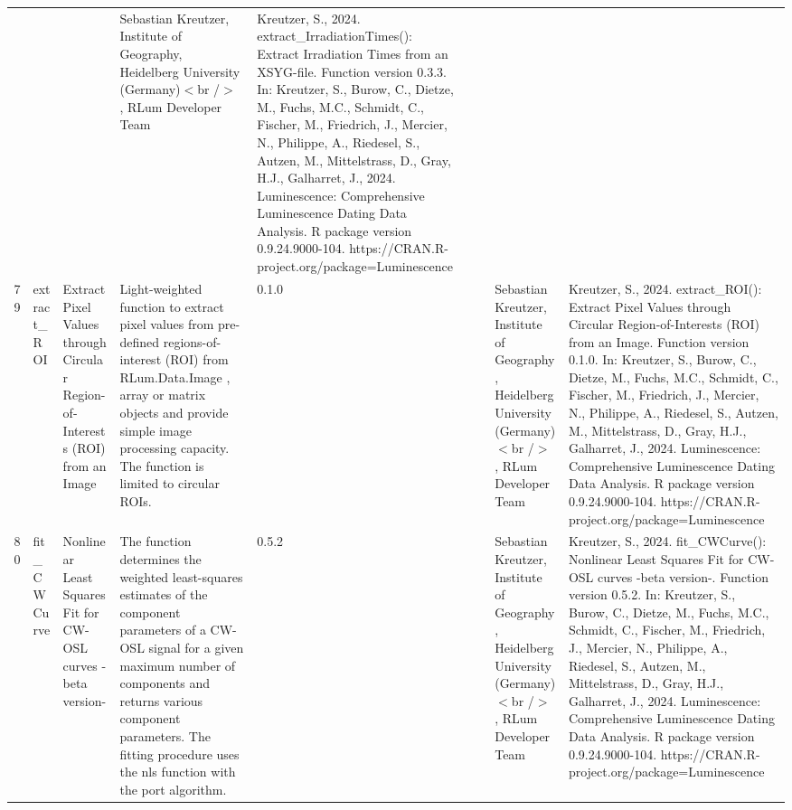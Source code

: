 \begin{table}[ht]
\begin{tabular}{rllllllll}
 &  &  & Sebastian Kreutzer, Institute of Geography, Heidelberg University (Germany)$<$br /$>$ , RLum Developer Team & Kreutzer, S., 2024. extract\_IrradiationTimes(): Extract Irradiation Times from an XSYG-file. Function version 0.3.3. In: Kreutzer, S., Burow, C., Dietze, M., Fuchs, M.C., Schmidt, C., Fischer, M., Friedrich, J., Mercier, N., Philippe, A., Riedesel, S., Autzen, M., Mittelstrass, D., Gray, H.J., Galharret, J., 2024. Luminescence: Comprehensive Luminescence Dating Data Analysis. R package version 0.9.24.9000-104. https://CRAN.R-project.org/package=Luminescence
 \\ 
  79 & extract\_ROI & Extract Pixel Values through Circular Region-of-Interests (ROI) from an Image & Light-weighted function to extract pixel values from pre-defined regions-of-interest (ROI) from RLum.Data.Image ,  array  or  matrix  objects and provide simple image processing capacity. The function is limited to circular ROIs. & 0.1.0
 &  &  & Sebastian Kreutzer, Institute of Geography, Heidelberg University (Germany)$<$br /$>$ , RLum Developer Team & Kreutzer, S., 2024. extract\_ROI(): Extract Pixel Values through Circular Region-of-Interests (ROI) from an Image. Function version 0.1.0. In: Kreutzer, S., Burow, C., Dietze, M., Fuchs, M.C., Schmidt, C., Fischer, M., Friedrich, J., Mercier, N., Philippe, A., Riedesel, S., Autzen, M., Mittelstrass, D., Gray, H.J., Galharret, J., 2024. Luminescence: Comprehensive Luminescence Dating Data Analysis. R package version 0.9.24.9000-104. https://CRAN.R-project.org/package=Luminescence
 \\ 
  80 & fit\_CWCurve & Nonlinear Least Squares Fit for CW-OSL curves -beta version- & The function determines the weighted least-squares estimates of the component parameters of a CW-OSL signal for a given maximum number of components and returns various component parameters. The fitting procedure uses the  nls  function with the  port  algorithm. & 0.5.2
 &  &  & Sebastian Kreutzer, Institute of Geography, Heidelberg University (Germany)$<$br /$>$ , RLum Developer Team & Kreutzer, S., 2024. fit\_CWCurve(): Nonlinear Least Squares Fit for CW-OSL curves -beta version-. Function version 0.5.2. In: Kreutzer, S., Burow, C., Dietze, M., Fuchs, M.C., Schmidt, C., Fischer, M., Friedrich, J., Mercier, N., Philippe, A., Riedesel, S., Autzen, M., Mittelstrass, D., Gray, H.J., Galharret, J., 2024. Luminescence: Comprehensive Luminescence Dating Data Analysis. R package version 0.9.24.9000-104. https://CRAN.R-project.org/package=Luminescence
 \\ 

\end{tabular}
\end{table}
